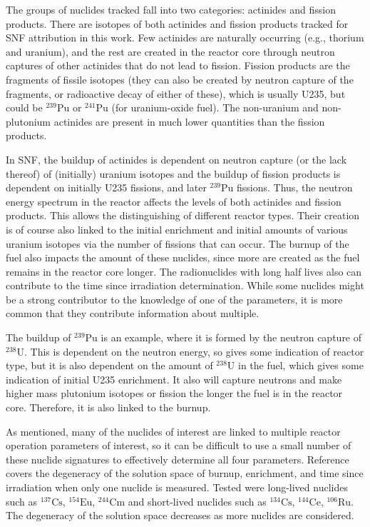The groups of nuclides tracked fall into two categories: actinides and fission
products. There are isotopes of both actinides and fission products tracked for
\gls{SNF} attribution in this work.  Few actinides are naturally occurring
(e.g., thorium and uranium), and the rest are created in the reactor core
through neutron captures of other actinides that do not lead to fission.
Fission products are the fragments of fissile isotopes (they can also be
created by neutron capture of the fragments, or radioactive decay of either of
these), which is usually \gls{U235}, but could be ${}^{239}\text{Pu}$ or
${}^{241}\text{Pu}$ (for uranium-oxide fuel).  The non-uranium and
non-plutonium actinides are present in much lower quantities than the fission
products.

In \gls{SNF}, the buildup of actinides is dependent on neutron capture (or the
lack thereof) of (initially) uranium isotopes and the buildup of fission
products is dependent on initially \gls{U235} fissions, and later
${}^{239}\text{Pu}$ fissions.  Thus, the neutron energy spectrum in the reactor
affects the levels of both actinides and fission products.  This allows the
distinguishing of different reactor types.  Their creation is of course also
linked to the initial enrichment and initial amounts of various uranium
isotopes via the number of fissions that can occur.  The burnup of the fuel
also impacts the amount of these nuclides, since more are created as the fuel
remains in the reactor core longer.  The radionuclides with long half lives
also can contribute to the time since irradiation determination. While some
nuclides might be a strong contributor to the knowledge of one of the
parameters, it is more common that they contribute information about multiple. 

The buildup of ${}^{239}\text{Pu}$ is an example, where it is formed by the
neutron capture of ${}^{238}\text{U}$. This is dependent on the neutron energy,
so gives some indication of reactor type, but it is also dependent on the
amount of ${}^{238}\text{U}$ in the fuel, which gives some indication of
initial \gls{U235} enrichment. It also will capture neutrons and make higher
mass plutonium isotopes or fission the longer the fuel is in the reactor core.
Therefore, it is also linked to the burnup.

As mentioned, many of the nuclides of interest are linked to multiple reactor
operation parameters of interest, so it can be difficult to use a small number
of these nuclide signatures to effectively determine all four parameters.
Reference \cite{skutnik_2016} covers the degeneracy of the solution space of
burnup, enrichment, and time since irradiation when only one nuclide is
measured.  Tested were long-lived nuclides such as ${}^{137}\text{Cs}$,
${}^{154}\text{Eu}$, ${}^{244}\text{Cm}$ and short-lived nuclides such as
${}^{134}\text{Cs}$, ${}^{144}\text{Ce}$, ${}^{106}\text{Ru}$. The degeneracy
of the solution space decreases as more nuclides are considered. 

